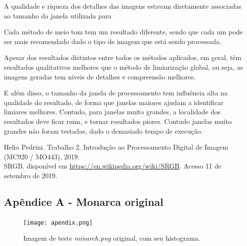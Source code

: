 \documentclass[conference]{IEEEtran}
\begin{document}
 A qualidade e riqueza dos detalhes das imagens estavam diretamente associadas ao tamanho da janela utilizada para

 Cada método de meio tom tem um resultado diferente, sendo que cada um pode ser mais recomendado dado o tipo de imagem que está sendo processada.

 Apesar dos resultados distintos entre todos os métodos aplicados, em geral, têm resultados qualitativos melhores que o método de limiarização global, ou seja, as imagens geradas tem níveis de detalhes e compreensão melhores.

 E além disso, o tamanho da janela de processamento tem influência alta na qualidade do resultado, de forma que janelas maiores ajudam a identificar limiares melhores. Contudo, para janelas muito grandes, a localidade dos resultados deve ficar ruim, e tornar resultados piores. Contudo janelas muito grandes não foram testadas, dado o demasiado tempo de execução.

\begin{thebibliography}{00}

 Helio Pedrini. Trabalho 2. Introdução ao Processamento Digital de Imagem (MC920 / MO443), 2019.\\

 SRGB. disponível em \url{https://en.wikipedia.org/wiki/SRGB}. Acesso 11 de setembro de 2019.

\end{thebibliography}

\begin{appendices}
\chapter{Apêndice A - Monarca original}
 \begin{figure}[ht]
     \centering
     \texttt{[image: apendix.png]}
     \caption{Imagem de teste \textit{minarch.png} original, com seu histograma.}
     \label{fig:monalisa}
 \end{figure}

\end{appendices}
\end{document}
